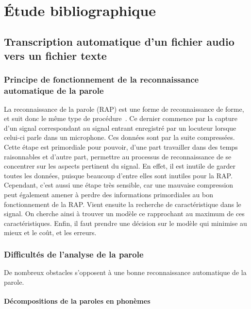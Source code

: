 	
	\part{Étude bibliographique}
	\parttoc
	
	\setcounter{chapter}{0} %
	\setcounter{section}{0} %
	
	\renewcommand*{\theHchapter}{\thepart.\thechapter}
	\chapter{Transcription automatique d'un fichier audio vers un fichier texte}
	\section{Principe de fonctionnement de la reconnaissance automatique de la parole}
	La reconnaissance de la parole (RAP) est une forme de reconnaissance de forme, et suit donc le même type de procédure~\cite{invited-paper}. Ce dernier commence par la capture d'un signal correspondant au signal entrant enregistré par un locuteur lorsque celui-ci parle dans un microphone. Ces données sont par la suite compressées. Cette étape est primordiale pour pouvoir, d'une part travailler dans des temps raisonnables et d'autre part, permettre au processus de reconnaissance de se concentrer sur les aspects pertinent du signal. En effet, il est inutile de garder toutes les données, puisque beaucoup d'entre elles sont inutiles pour la RAP. Cependant, c'est aussi une étape très sensible, car une mauvaise compression peut également amener à perdre des informations primordiales au bon fonctionnement de la RAP. Vient ensuite la recherche de caractéristique dans le signal. On cherche ainsi à trouver un modèle ce rapprochant au maximum de ces caractéristiques. Enfin, il faut prendre une décision sur le modèle qui minimise au mieux et le coût, et les erreurs. 
	
	\section{Difficultés de l'analyse de la parole}
	De nombreux obstacles s'opposent à une bonne reconnaissance automatique de la parole.
	\subsection{Décompositions de la paroles en phonèmes}

